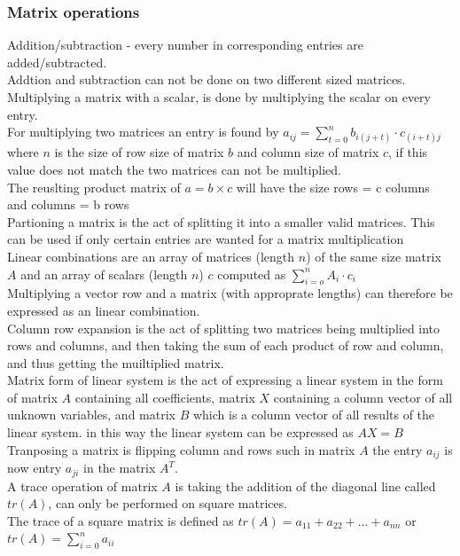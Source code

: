 \documentclass[12pt, a4paper]{article}
\begin{document}
			\subsubsection{Matrix operations}
				Addition/subtraction - every number in corresponding entries are added/subtracted.\\
				Addtion and subtraction can not be done on two different sized matrices.\\[4mm]
				Multiplying a matrix with a scalar, is done by multiplying the scalar on every entry.\\
				For multiplying two matrices an entry is found by $a_{ij}=\sum\limits_{t=0}^n b_{i(j+t)}\cdot c_{(i+t)j}$ where $n$ is the size of row size of matrix $b$ and column size of matrix $c$, if this value does not match the two matrices can not be multiplied.\\
				The reuslting product matrix of $a = b \times c$ will have the size rows = c columns and columns = b rows\\[4mm]
				Partioning a matrix is the act of splitting it into a smaller valid matrices. This can be used if only certain entries are wanted for a matrix multiplication\\
				Linear combinations are an array of matrices (length $n$) of the same size matrix $A$ and an array of scalars (length $n$) $c$ computed as $\sum\limits_{i=o}^n A_i\cdot c_i$\\
				Multiplying a vector row and a matrix (with approprate lengths) can therefore be expressed as an linear combination.\\
				Column row expansion is the act of splitting two matrices being multiplied into rows and columns, and then taking the sum of each product of row and column, and thus getting the muiltiplied matrix.\\[4mm]
				Matrix form of linear system is the act of expressing a linear system in the form of matrix $A$ containing all coefficients, matrix $X$ containing a column vector of all unknown variables, and matrix $B$ which is a column vector of all results of the linear system. in this way the linear system can be expressed as $AX=B$\\
				Tranposing a matrix is flipping column and rows such in matrix $A$ the entry $a_{ij}$ is now entry $a_{ji}$ in the matrix $A^T$.\\
				A trace operation of matrix $A$ is taking the addition of the diagonal line called $tr(A)$, can only be performed on square matrices.\\
				The trace of a square matrix is defined as $tr(A)=a_{11}+a_{22}+...+a_{nn}$ or $tr(A)=\sum\limits_{i=0}^n a_{ii}$\\
\end{document}
